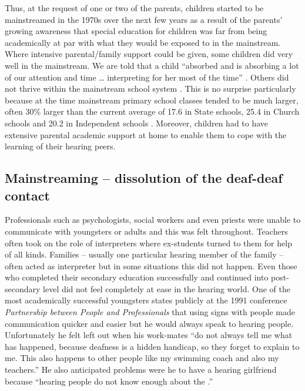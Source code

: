 \documentclass[output=paper]{langsci/langscibook}
\begin{document}
Thus, at the request of one or two of the parents,  children
started to be mainstreamed in the 1970s over the next few years as a
result of the parents’ growing awareness that special education for
 children was far from being academically at par with what they
would be exposed to in the mainstream.  Where intensive
parental/family support could be given, some children did very well in
the mainstream.  We are told that a  child “absorbed and is
absorbing a lot of our attention and time {\dots} interpreting for her
most of the time” \citep[45]{bezz91}.  Others did not thrive
within the mainstream school system \citep[38]{g91}.  This is no surprise particularly because at the time mainstream
primary school classes tended to be much larger, often 30\% larger
than the current average of 17.6 in State schools, 25.4 in Church
schools and 20.2 in Independent schools 
\citep{o16}.  Moreover,  children had to have extensive
parental academic support at home to enable them to cope with the
learning of their hearing peers.

\subsection{Mainstreaming – dissolution of the deaf-deaf contact}

Professionals such as psychologists, social workers and even priests
were unable to communicate with  youngsters or adults and this was
felt throughout. Teachers often took on the role of interpreters
where ex-students turned to them for help of all kinds.  Families –
usually one particular hearing member of the family – often acted as
interpreter but in some situations this did not happen.  Even those
who completed their secondary education successfully and continued
into post-secondary level did not feel completely at ease in the
hearing world. One of the most academically successful youngsters
states publicly at the 1991 conference \textit{Partnership between
   People and Professionals} that using signs with  people
made communication quicker and easier but he would always speak to
hearing people.  Unfortunately he felt left out when his work-mates
“do not always tell me what has happened, because deafness is a hidden
handicap, so they forget to explain to me.  This also happens to other
people like my swimming coach and also my teachers.”  He also
anticipated problems were he to have a hearing girlfriend because
“hearing people do not know enough about the .”
\end{document}
